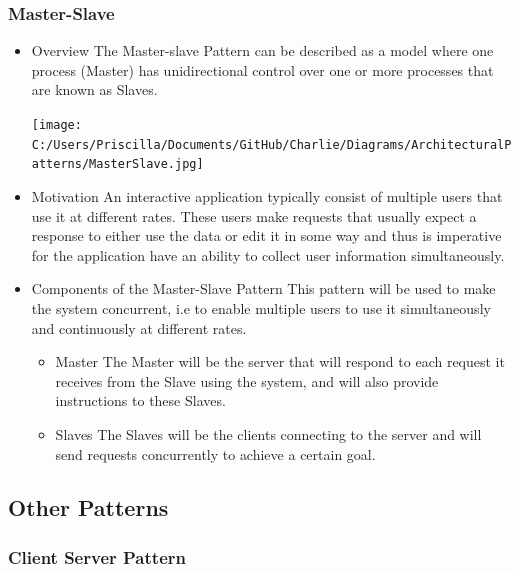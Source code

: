 \documentclass{article}
\begin{document}
\subsubsection{Master-Slave}
\begin{itemize}
\item{Overview}
\newline
The Master-slave Pattern can be described as  a model where one process (Master) has unidirectional control over one or more processes that are known as Slaves. 
\newline
\begin{minipage}{\linewidth} 
\centering
\texttt{[image: C:/Users/Priscilla/Documents/GitHub/Charlie/Diagrams/ArchitecturalPatterns/MasterSlave.jpg]}
\end{minipage}
\item{Motivation}
\newline
An interactive application typically consist of multiple users that use it at different rates. These users make requests that usually expect a response to either use the data or edit it in some way and thus is imperative for the application have an ability to collect user information simultaneously.

\item{Components of the Master-Slave Pattern}
\newline
This pattern will be used to make the system concurrent, i.e to enable multiple users to use it simultaneously and continuously at different rates.
\begin{itemize}
\item{Master} 
\newline
The Master will be the server that will respond to each request it receives from the Slave using the system, and will also provide instructions to these Slaves.
\item{Slaves}
\newline 
The Slaves will be the clients connecting to the server and will  send requests concurrently to achieve a certain goal.
\end{itemize}
\end{itemize}

\subsection{Other Patterns}
\subsubsection{Client Server Pattern}
\end{document}
